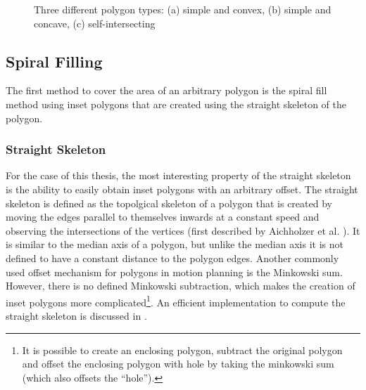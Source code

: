 \begin{figure}
\centering
{}
\caption{Three different polygon types: (a) simple and convex, (b) simple and concave, (c) self-intersecting}
\label{straight_skel}
\end{figure}

\subsection{Spiral Filling}

The first method to cover the area of an arbitrary polygon is the spiral fill method using inset polygons that are created using the straight skeleton of the polygon.

\subsubsection{Straight Skeleton}

For the case of this thesis, the most interesting property of the straight skeleton is the ability to easily obtain inset polygons with an arbitrary offset. The straight skeleton is defined as the topolgical skeleton of a polygon that is created by moving the edges parallel to themselves inwards at a constant speed and observing the intersections of the vertices (first described by Aichholzer et al. \citet{Aichholzer:jucs_1_12:a_novel_type_of}). 
It is similar to the median axis of a polygon, but unlike the median axis it is not defined to have a constant distance to the polygon edges. 
Another commonly used offset mechanism for polygons in motion planning is the Minkowski sum. However, there is no defined Minkowski subtraction, which makes the creation of inset polygons more complicated\footnote{It is possible to create an enclosing polygon, subtract the original polygon and offset the enclosing polygon with hole by taking the minkowski sum (which also offsets the \enquote{hole}).}. An efficient implementation to compute the straight skeleton is discussed in \citet{huber2010computing}.

